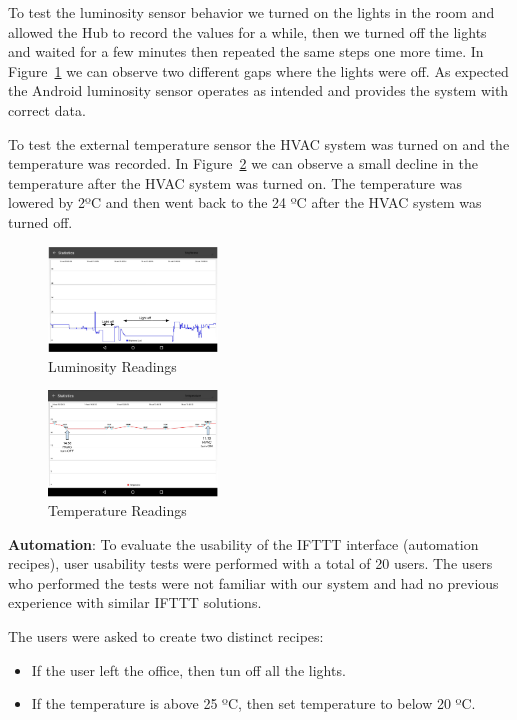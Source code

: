 \documentclass[conference]{IEEEtran}
\begin{document}
To test the luminosity sensor behavior we turned on the lights in the room and allowed the Hub to record the values for a while, then we turned off the lights and waited for a few minutes then repeated the same steps one more time. In Figure~\ref{eval:lights} we can observe two different gaps where the lights were off. As expected the Android luminosity sensor operates as intended and provides the system with correct data. 

To test the external temperature sensor the HVAC system was turned on and the temperature was recorded. In Figure~\ref{eval:temp} we can observe a small decline in the temperature after the HVAC system was turned on. The temperature was lowered by 2ºC and then went back to the 24 ºC after the HVAC system was turned off.

\begin{figure}[]
\centering
\includegraphics[width=0.4\textwidth]{Figures/eval_lights}
\caption{Luminosity Readings}
\label{eval:lights}
\end{figure}

\begin{figure}[]
\centering
\includegraphics[width=0.4\textwidth]{Figures/eval_temp}
\caption{Temperature Readings}
\label{eval:temp}
\end{figure}

\textbf{Automation}: To evaluate the usability of the \ac{IFTTT} interface (automation recipes), user usability tests were performed with a total of 20 users. The users who performed the tests were not familiar with our system and had no previous experience with similar \ac{IFTTT} solutions.

The users were asked to create two distinct recipes:

\begin{itemize}
  \item If the user left the office, then tun off all the lights.
  \item If the temperature is above 25 ºC, then set temperature to below 20 ºC. 
\end{itemize} 
\end{document}
